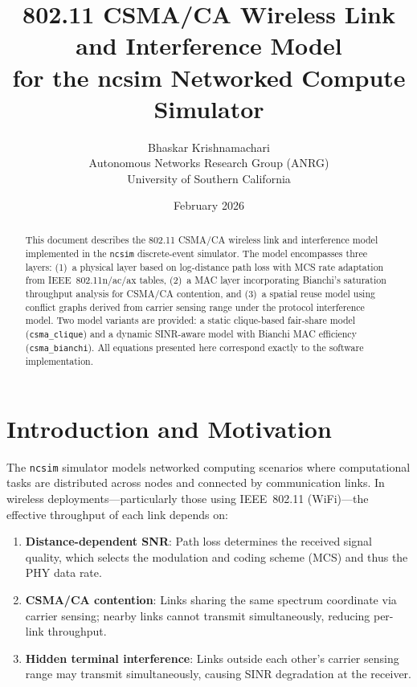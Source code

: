 \documentclass[11pt,letterpaper]{article}
\title{802.11 CSMA/CA Wireless Link and Interference Model\\for the ncsim Networked Compute Simulator}
\author{Bhaskar Krishnamachari\\
Autonomous Networks Research Group (ANRG)\\
University of Southern California}
\date{February 2026}
\newcommand{\ncsim}{\texttt{ncsim}}
\begin{document}
\maketitle

\begin{abstract}
This document describes the 802.11 CSMA/CA wireless link and interference
model implemented in the \ncsim{} discrete-event simulator.  The model
encompasses three layers: (1)~a physical layer based on log-distance path loss
with MCS rate adaptation from IEEE~802.11n/ac/ax tables, (2)~a MAC layer
incorporating Bianchi's saturation throughput analysis for CSMA/CA contention,
and (3)~a spatial reuse model using conflict graphs derived from carrier
sensing range under the protocol interference model.  Two model variants are
provided: a static clique-based fair-share model (\texttt{csma\_clique}) and a
dynamic SINR-aware model with Bianchi MAC efficiency
(\texttt{csma\_bianchi}).  All equations presented here correspond exactly to
the software implementation.
\end{abstract}

\tableofcontents
\newpage

\section{Introduction and Motivation}
\label{sec:intro}

The \ncsim{} simulator models networked computing scenarios where computational
tasks are distributed across nodes and connected by communication links.  In
wireless deployments---particularly those using IEEE~802.11 (WiFi)---the
effective throughput of each link depends on:

\begin{enumerate}[itemsep=2pt]
\item \textbf{Distance-dependent SNR}: Path loss determines the received
  signal quality, which selects the modulation and coding scheme (MCS) and
  thus the PHY data rate.
\item \textbf{CSMA/CA contention}: Links sharing the same spectrum coordinate
  via carrier sensing; nearby links cannot transmit simultaneously, reducing
  per-link throughput.
\item \textbf{Hidden terminal interference}: Links outside each other's
  carrier sensing range may transmit simultaneously, causing SINR degradation
  at the receiver.
\end{enumerate}
\end{document}
